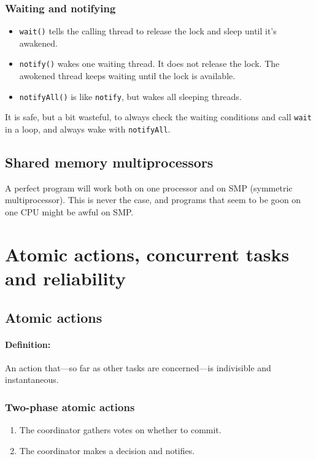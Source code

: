 \documentclass[a4paper, 12pt]{article}
\begin{document}
\subsubsection{Waiting and notifying}
\begin{itemize}
	\item \texttt{wait()} tells the calling thread to release the lock and sleep until it's awakened.
	\item \texttt{notify()} wakes one waiting thread. It does not release the lock. The awokened thread keeps waiting until the lock is available.
	\item \texttt{notifyAll()} is like \texttt{notify}, but wakes all sleeping threads.
\end{itemize}
It is safe, but a bit wasteful, to always check the waiting conditions and call \texttt{wait} in a loop, and always wake with \texttt{notifyAll}.

\subsection{Shared memory multiprocessors}
A perfect program will work both on one processor and on SMP (symmetric multiprocessor). This is never the case, and programs that seem to be goon on one CPU might be awful on SMP.



\section{Atomic actions, concurrent tasks and reliability}\label{sec:atomic}

\subsection{Atomic actions}
\paragraph{Definition:} An action that---so far as other tasks are concerned---is indivisible and instantaneous.

\subsubsection{Two-phase atomic actions}
\begin{enumerate}
	\item The coordinator gathers votes on whether to commit.
	\item The coordinator makes a decision and notifies.
\end{enumerate}
\end{document}

